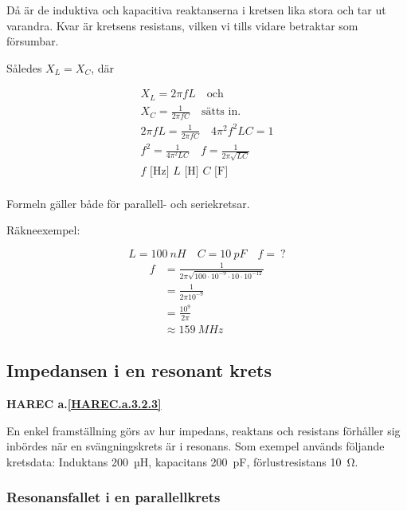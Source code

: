 Då är de induktiva och kapacitiva reaktanserna i kretsen lika stora och tar ut
varandra. Kvar är kretsens resistans, vilken vi tills vidare betraktar som
försumbar.

Således \(X_L = X_C\), där

\begin{gather*}
  X_L = 2πfL \quad \text{och} \\
  X_C = \frac{1}{2πfC} \quad \text{sätts in.} \\
  2πfL = \frac{1}{2πfC} \quad 4π^2f^2LC = 1 \\
  f^2 = \frac{1}{4π^2LC} \quad f = \frac{1}{2π\sqrt{LC}} \\
  f\text{ [Hz] }L\text{ [H] }C\text{ [F] } \\
\end{gather*}

Formeln gäller både för parallell- och seriekretsar.

Räkneexempel:

\[L = 100\ nH \quad C = 10\ pF \quad f =\ ?\]
\begin{align*}
  f &= \frac{1}{2π\sqrt{100 \cdot 10^{-9} \cdot 10 \cdot 10^{-12}}} \\
  &= \frac{1}{2π10^{-9}} \\
  &= \frac{10^9}{2π} \\
  &\approx 159\ MHz
\end{align*}

\subsection{Impedansen i en resonant krets}
\textbf{HAREC a.\ref{HAREC.a.3.2.3}\label{myHAREC.a.3.2.3}}

En enkel framställning görs av hur impedans, reaktans och resistans förhåller
sig inbördes när en svängningskrets är i resonans. Som exempel används följande
kretsdata: Induktans 200~µH, kapacitans 200~pF, förlustresistans 10~Ω.

\subsubsection{Resonansfallet i en parallellkrets}
\label{parallellresonans}


